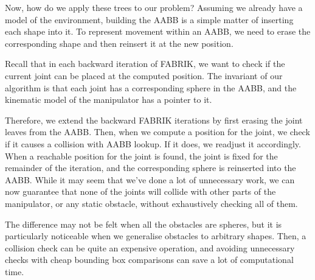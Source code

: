 Now, how do we apply these trees to our problem? Assuming we already have a model of the environment, building the AABB is a simple matter of inserting each shape into it. To represent movement within an AABB, we need to erase the corresponding shape and then reinsert it at the new position.

Recall that in each backward iteration of FABRIK, we want to check if the current joint can be placed at the computed position. The invariant of our algorithm is that each joint has a corresponding sphere in the AABB, and the kinematic model of the manipulator has a pointer to it.

Therefore, we extend the backward FABRIK iterations by first erasing the joint leaves from the AABB. Then, when we compute a position for the joint, we check if it causes a collision with AABB lookup. If it does, we readjust it accordingly. When a reachable position for the joint is found, the joint is fixed for the remainder of the iteration, and the corresponding sphere is reinserted into the AABB. While it may seem that we've done a lot of unnecessary work, we can now guarantee that none of the joints will collide with other parts of the manipulator, or any static obstacle, without exhaustively checking all of them.

The difference may not be felt when all the obstacles are spheres, but it is particularly noticeable when we generalise obstacles to arbitrary shapes. Then, a collision check can be quite an expensive operation, and avoiding unnecessary checks with cheap bounding box comparisons can save a lot of computational time.
